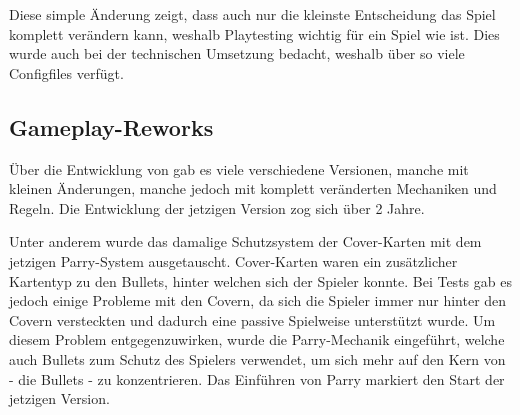 Diese simple Änderung zeigt, dass auch nur die kleinste Entscheidung das Spiel komplett verändern kann, weshalb Playtesting
wichtig für ein Spiel wie \FF ist. Dies wurde auch bei der technischen Umsetzung bedacht, weshalb \FF über so viele Configfiles verfügt.


\subsection{Gameplay-Reworks}\label{subsec:placementMatters}
Über die Entwicklung von \FF gab es viele verschiedene Versionen, manche mit kleinen Änderungen, manche jedoch mit komplett veränderten Mechaniken und Regeln.
Die Entwicklung der jetzigen Version zog sich über 2 Jahre.


Unter anderem wurde das damalige Schutzsystem der Cover-Karten mit dem jetzigen Parry-System ausgetauscht.
Cover-Karten waren ein zusätzlicher Kartentyp zu den Bullets, hinter welchen sich der Spieler  konnte.
Bei Tests gab es jedoch einige Probleme mit den Covern, da sich die Spieler immer nur hinter den Covern versteckten
und dadurch eine passive Spielweise unterstützt wurde. Um diesem Problem entgegenzuwirken, wurde die Parry-Mechanik eingeführt,
welche auch Bullets zum Schutz des Spielers verwendet, um sich mehr auf den Kern von \FF - die Bullets - zu konzentrieren.
Das Einführen von Parry markiert den Start der jetzigen \FF Version.

\renewcommand{\kapitelautor}{}
